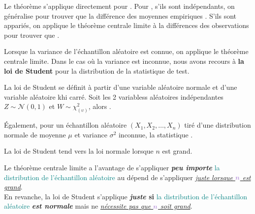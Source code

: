 \documentclass[french]{article}
\begin{document}
\begin{multicols*}{2}
Le théorème s'applique directement pour \textit{\underline{}}. Pour \textit{\underline{}}, s'ils sont indépendants, on généralise pour trouver que la différence des moyennes empiriques . S'ils sont appariés, on applique le théorème centrale limite à la différences des observations pour trouver que .

\bigskip

Lorsque la variance de l'échantillon aléatoire est connue, on applique le théorème centrale limite. Dans le cas où la variance est inconnue, nous avons recours à \textbf{la loi de Student} pour la distribution de la statistique de test. 

\begin{rappel_enhanced}
La loi de Student se définit à partir d'une variable aléatoire normale et d'une variable aléatoire khi carré. Soit les 2 variabless aléatoires indépendantes $Z \sim \mathcal{N}(0, 1)$ et $W \sim \chi^{2}_{(\upsilon)}$, alors .

\bigskip

Également, pour un échantillon aléatoire $(X_{1}, X_{2}, \dots, X_{n})$ tiré d'une distribution normale de moyenne $\mu$ et variance $\sigma^{2}$ inconnue, la statistique .

\bigskip

La loi de Student tend vers la loi normale lorsque $n$ est grand.
\end{rappel_enhanced}

\bigskip

Le théorème centrale limite a l'avantage de s'appliquer \textbf{\textit{peu importe}} \textcolor{teal}{la distribution de l'échantillon aléatoire} au dépend de s'appliquer \underline{\textit{juste lorsque $\textcolor{amethyst}{n}$ est grand}}. \\
En revanche, la loi de Student s'applique \textbf{\textit{juste} si} \textcolor{teal}{la distribution de l'échantillon aléatoire} \textbf{\textit{est normale}} mais ne \underline{\textit{nécessite pas que $\textcolor{amethyst}{n}$ soit grand}}. 




\end{multicols*}
\end{document}
